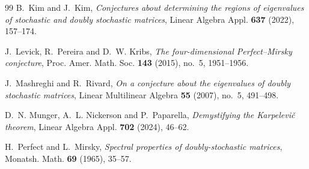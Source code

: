 \documentclass[11pt]{amsart}
\theoremstyle{definition}
\theoremstyle{remark}
\begin{document}
\begin{thebibliography}{99}
B.~Kim and J.~Kim, \emph{Conjectures about determining the regions of eigenvalues of stochastic and doubly stochastic matrices}, Linear Algebra Appl. \textbf{637} (2022), 157--174.

J.~Levick, R.~Pereira and D.~W. Kribs, \emph{The four-dimensional Perfect--Mirsky conjecture}, Proc. Amer. Math. Soc. \textbf{143} (2015), no.~5, 1951--1956.

J.~Mashreghi and R.~Rivard, \emph{On a conjecture about the eigenvalues of doubly stochastic matrices}, Linear Multilinear Algebra \textbf{55} (2007), no.~5, 491--498.

D.~N. Munger, A.~L. Nickerson and P.~Paparella, \emph{Demystifying the Karpelevi\v{c} theorem}, Linear Algebra Appl. \textbf{702} (2024), 46--62.

H.~Perfect and L.~Mirsky, \emph{Spectral properties of doubly-stochastic matrices}, Monatsh. Math. \textbf{69} (1965), 35--57.

\end{thebibliography}
\end{document}
